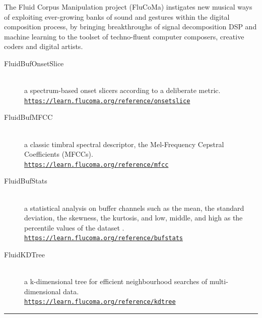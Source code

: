 {The Fluid Corpus Manipulation project (FluCoMa) instigates new musical ways of exploiting ever-growing banks of sound and gestures within the digital composition process, by bringing breakthroughs of signal decomposition DSP and machine learning to the toolset of techno-fluent computer composers, creative coders and digital artists.
\begin{description}
\item[FluidBufOnsetSlice] \hfill \\ a spectrum-based onset slicers according to a deliberate metric.\\ \href{https://learn.flucoma.org/reference/onsetslice}{\texttt{\small https://learn.flucoma.org/reference/onsetslice}}
\item[FluidBufMFCC] \hfill \\ a classic timbral spectral descriptor, the Mel-Frequency Cepstral Coefficients (MFCCs).\\ \href{https://learn.flucoma.org/reference/mfcc}{\texttt{\small https://learn.flucoma.org/reference/mfcc}}
\item[FluidBufStats] \hfill \\ a statistical analysis on buffer channels such as the mean, the standard deviation, the skewness, the kurtosis, and low, middle, and high as the percentile values of the dataset .\\ \href{https://learn.flucoma.org/reference/bufstats}{\texttt{\small https://learn.flucoma.org/reference/bufstats}}
\item[FluidKDTree] \hfill \\ a k-dimensional tree for efficient neighbourhood searches of multi-dimensional data.\\ \href{https://learn.flucoma.org/reference/kdtree}{\texttt{\small https://learn.flucoma.org/reference/kdtree}}
\end{description}} 



\begin{center}\rule{0.5\linewidth}{0.5pt}\end{center}

\bigskip



